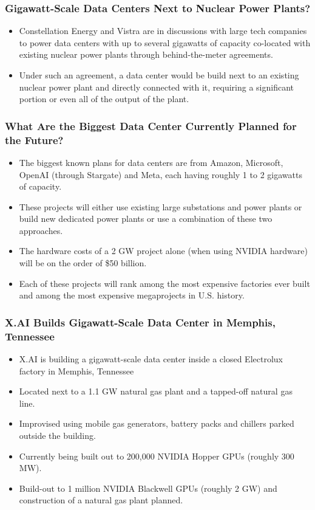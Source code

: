 \documentclass[aspectratio=169]{beamer}
\begin{document}
    \begin{frame}
        \frametitle{Gigawatt-Scale Data Centers Next to Nuclear Power Plants?}
        \begin{itemize}
            \item Constellation Energy and Vistra are in discussions with large tech companies to power data centers with up to several gigawatts of capacity co-located with existing nuclear power plants through behind-the-meter agreements.~\parencite{data_center_frontier_gigawatt_2024, wall_street_journal_tech_2024, bloomberg_constellation_2024}
            \item Under such an agreement, a data center would be build next to an existing nuclear power plant and directly connected with it, requiring a significant portion or even all of the output of the plant.
        \end{itemize}
    \end{frame}
    \begin{frame}
        \frametitle{What Are the Biggest Data Center Currently Planned for the Future?}
        \begin{itemize}
            \item The biggest known plans for data centers are from Amazon, Microsoft, OpenAI (through Stargate) and Meta, each having roughly 1 to 2 gigawatts of capacity.
            \item These projects will either use existing large substations and power plants or build new dedicated power plants or use a combination of these two approaches.
            \item The hardware costs of a 2 GW project alone (when using NVIDIA hardware) will be on the order of \$50 billion.
            \item Each of these projects will rank among the most expensive factories ever built and among the most expensive megaprojects in U.S. history.
        \end{itemize}
    \end{frame}
    \begin{frame}
        \frametitle{X.AI Builds Gigawatt-Scale Data Center in Memphis, Tennessee}
        \begin{itemize}
            \item X.AI is building a gigawatt-scale data center inside a closed Electrolux factory in Memphis, Tennessee
            \item Located next to a 1.1 GW natural gas plant and a tapped-off natural gas line.
            \item Improvised using mobile gas generators, battery packs and chillers parked outside the building.
            \item Currently being built out to 200,000 NVIDIA Hopper GPUs (roughly 300 MW).
            \item Build-out to 1 million NVIDIA Blackwell GPUs (roughly 2 GW) and construction of a natural gas plant planned.
        \end{itemize}
    \end{frame}
\end{document}
